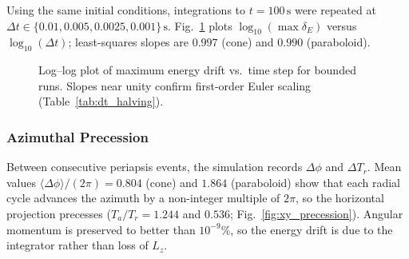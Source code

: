 \documentclass[11pt,letterpaper]{article}
\begin{document}
Using the same initial conditions, integrations to $t=100\,\mathrm{s}$ were repeated at $\Delta t\in\{0.01,0.005,0.0025,0.001\}\,\mathrm{s}$. Fig.~\ref{fig:dt_scaling} plots $\log_{10}(\max\delta_E)$ versus $\log_{10}(\Delta t)$; least-squares slopes are $0.997$ (cone) and $0.990$ (paraboloid).

\begin{figure}[htbp]
  \centering
  \caption{Log--log plot of maximum energy drift vs.\ time step for bounded runs. Slopes near unity confirm first-order Euler scaling (Table~\ref{tab:dt_halving}).}
  \label{fig:dt_scaling}
\end{figure}

\subsubsection{Azimuthal Precession}
\label{sec:azimuth}

Between consecutive periapsis events, the simulation records $\Delta\phi$ and $\Delta T_r$. Mean values $\langle\Delta\phi\rangle/(2\pi)=0.804$ (cone) and $1.864$ (paraboloid) show that each radial cycle advances the azimuth by a non-integer multiple of $2\pi$, so the horizontal projection precesses ($T_a/T_r=1.244$ and $0.536$; Fig.~\ref{fig:xy_precession}). Angular momentum is preserved to better than $10^{-9}\%$, so the energy drift is due to the integrator rather than loss of $L_z$.
\end{document}
